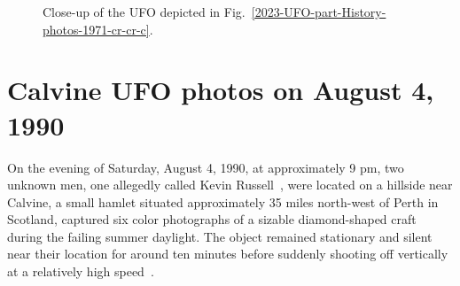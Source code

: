 %
\begin{figure}[b]
\sidecaption
%
%
\caption{Close-up of the UFO depicted in Fig.~\ref{2023-UFO-part-History-photos-1971-cr-cr-c}.}
\label{2023-UFO-part-History-photos-1971-cr-cr-cu}       %
\end{figure}



\clearpage




\section{Calvine  UFO photos  on August 4,  1990}
\label{2023-UFO-part-History-photos-1990-ca}

On the evening of Saturday, August 4,  1990, at approximately 9 pm,
two unknown men, one allegedly called Kevin Russell~\cite{YTDTMarch23}, were  located on a hillside near Calvine, a small hamlet situated approximately 35 miles north-west of Perth in Scotland,
captured six color photographs of a sizable diamond-shaped craft during the failing summer daylight.
The object remained stationary and silent near their location for around
ten minutes before suddenly shooting off vertically at a relatively high speed~\cite{AdamsCalvin20222Aug,ClarkeCalvin22,YTDTMarch23}.

